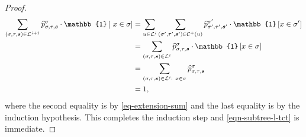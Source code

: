 \documentclass[11pt]{article}
\newcommand{\id}[1]{\mathbb{1}\left[#1\right]}
\newcommand{\seqS}{\boldsymbol{s}}
\begin{document}
\begin{proof}
\begin{align*}
        \sum_{(\sigma,\tau, \seqS)\in \+L^{i+1}} \widehat{p}^{\sigma}_{\sigma,\tau,\seqS}\cdot \id{\ x\in \sigma}&=\sum_{u \in \+L^{i}}\sum_{(\sigma',\tau', \seqS')\in \+C^{+}(u)} \widehat{p}^{\sigma'}_{\sigma',\tau',\seqS'}\cdot \id{ x\in \sigma'}\\
        &=\sum_{(\sigma,\tau, \seqS)\in \+L^{i}}\widehat{p}^{\sigma}_{\sigma,\tau,\seqS}\cdot \id{x \in \sigma}\\
        &=\sum_{(\sigma,\tau, \seqS)\in \+L^i:\  x\in \sigma} \widehat{p}^{\sigma}_{\sigma,\tau,\seqS}\\
        &=1,
    \end{align*}
    where the second equality is by \eqref{eq-extension-sum} and the last equality is by the induction hypothesis.
    This completes the induction step and \eqref{eqn-subtree-l-tct} is immediate.


\end{proof}
\end{document}
